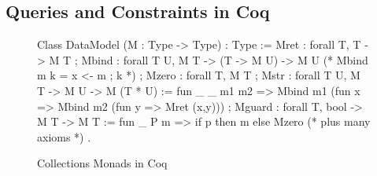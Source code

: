 \documentclass[preprint]{sigplanconf}
\begin{document}
\subsection{Queries and Constraints in Coq}

\begin{figure}[t]
\label{fig:chaseable-functor}
\begin{coq}
Class DataModel (M : Type -> Type) : Type :=
{ Mret  : forall {T}, T -> M T
; Mbind : forall {T U}, M T -> (T -> M U) -> M U (* Mbind m k = x <- m ; k *)
; Mzero : forall {T}, M T
; Mstr : forall {T U}, M T -> M U -> M (T * U) :=
     fun _ _ m1 m2 => Mbind m1 (fun x => Mbind m2 (fun y => Mret (x,y)))
; Mguard : forall {T}, bool -> M T -> M T :=
     fun _ P m => if p then m else Mzero
 (* plus many axioms *)    
}.
\end{coq}






\caption{Collections Monads in Coq}
\label{fig:chaseable-functor}
\end{figure}
\end{document}
